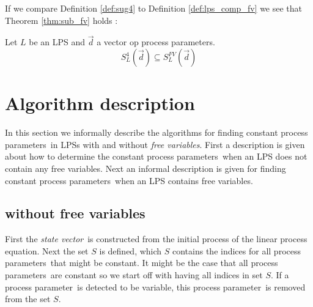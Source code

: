 \index{}\documentclass[a4paper,10pt]{article}
\theoremstyle{plain}
\theoremstyle{definition}
\newcommand{\lps}{linear process equation}
\newcommand{\ovr}{\overrightarrow}
\newcommand{\pp}{process parameter}
\newcommand{\pps}{process parameters}
\newcommand{\ti}{\textit}
\newcommand{\tb}{\textbf}
\newcommand{\sv}{\textit{state vector}}
\begin{document}
If we compare Definition \ref{def:sug4} to Definition \ref{def:lps_comp_fv} we see that Theorem \ref{thm:sub_fv} holds :
\begin{thm}\label{thm:sub_fv} Let $L$ be an LPS and $\ovr{d}$ a vector op \pps . 
$$S_L^4(\ovr{d}) \subseteq S_L^{FV}(\ovr{d}) $$
\end{thm} 




\section{Algorithm description}
In this section we informally describe the algorithms for finding constant \pps\ in LPSs with and without \ti{free variables}. First a description is given about how to determine the constant \pps\ when an LPS does not contain any free variables. Next an informal description is given for finding constant \pps\ when an LPS contains free variables.

\subsection{without free variables}\label{alg:org}

First the \sv\ is constructed from the initial process of the \lps. Next the set $S$ is defined, which $S$ contains the indices for all \pps\ that might be constant. It might be the case that all \pps\ are constant so we start off with having all indices in set $S$. If a \pp\ is detected to be variable, this \pp\ is removed from the set $S$.
\end{document}
